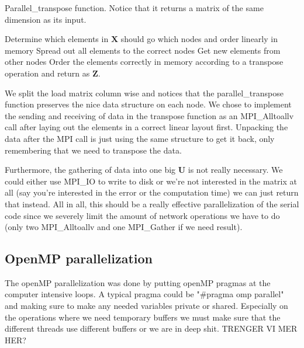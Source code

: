 \begin{algorithm}[H]
 \caption{Parallel\_transpose function. Notice that it returns a matrix of the same dimension as its input.}
 Determine which elements in $\mathbf{X}$ should go which nodes and order linearly in memory \;
 Spread out all elements to the correct nodes \;
 Get new elements from other nodes \;
 Order the elements correctly in memory according to a transpose operation and return as $\mathbf{Z}$.
 \label{code:transpose}
\end{algorithm}
We split the load matrix column wise and notices that the parallel\_transpose function preserves the nice data structure on each node. We chose to implement the sending and receiving of data in the transpose function as an MPI\_Alltoallv call after laying out the elements in a correct linear layout first. Unpacking the data after the MPI call is just using the same structure to get it back, only remembering that we need to transpose the data.

Furthermore, the gathering of data into one big $\mathbf{U}$ is not really necessary. We could either use MPI\_IO to write to disk or we're not interested in the matrix at all (say you're interested in the error or the computation time) we can just return that instead. All in all, this should be a really effective parallelization of the serial code since we severely limit the amount of network operations we have to do (only two MPI\_Alltoallv and one MPI\_Gather if we need result).

\subsection*{OpenMP parallelization}
The openMP parallelization was done by putting openMP pragmas at the computer intensive loops. A typical pragma could be "\#pragma omp parallel" and making sure to make any needed variables private or shared. Especially on the operations where we need temporary buffers we must make sure that the different threads use different buffers or we are in deep shit. TRENGER VI MER HER?